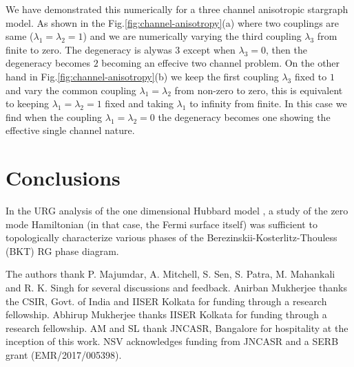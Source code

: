 \documentclass[reprint,prb,superscriptaddress]{revtex4-2}
\begin{document}
We have demonstrated this numerically for a three channel anisotropic stargraph model. As shown in the Fig.\ref{fig:channel-anisotropy}(a) where two couplings are same ($\lambda_1=\lambda_2=1$) and we are numerically varying the third coupling $\lambda_3$ from finite to zero. The degeneracy is alywas $3$ except when $\lambda_3=0$, then the degeneracy becomes $2$ becoming an effecive two channel problem. On the other hand in Fig.\ref{fig:channel-anisotropy}(b) we keep the first coupling $\lambda_3$ fixed to $1$ and vary the common coupling $\lambda_1=\lambda_2$ from non-zero to zero, this is equivalent to keeping $\lambda_1=\lambda_2=1$ fixed and taking $\lambda_1$ to infinity from finite. In this case we find when the coupling $\lambda_1=\lambda_2=0$ the degeneracy becomes one showing the effective single channel nature.











\section{Conclusions}
\lipsum[1-5]

In the URG analysis of the one dimensional Hubbard model \cite{1dhubjhep}, a study of the zero mode Hamiltonian (in that case, the Fermi surface itself) was sufficient to topologically characterize various phases of the Berezinskii-Kosterlitz-Thouless (BKT) RG phase diagram. 


\acknowledgments
The authors thank P. Majumdar, A. Mitchell, S. Sen, S. Patra, M. Mahankali and R. K. Singh for several discussions and feedback. Anirban Mukherjee thanks the CSIR, Govt. of India and IISER Kolkata for funding through a research fellowship. Abhirup Mukherjee thanks IISER Kolkata for funding through a research fellowship. AM and SL thank JNCASR, Bangalore for hospitality at the inception of this work. NSV acknowledges funding from JNCASR and a SERB grant (EMR/2017/005398).
\end{document}
